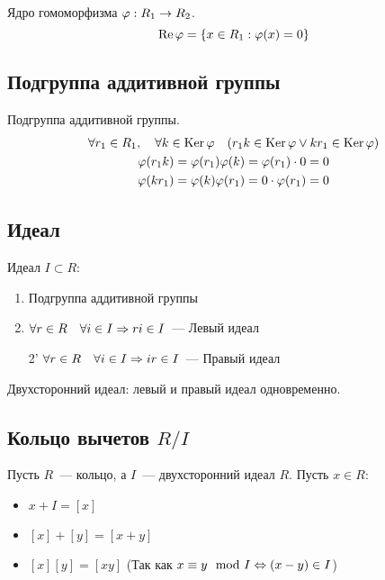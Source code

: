 \begin{definition}
  Ядро гомоморфизма $\varphi: R_1 \rightarrow R_2$.
  \[\operatorname{Re} \varphi = \{ x \in R_1: \varphi(x) = 0 \}\]
\end{definition}

\subsection{Подгруппа аддитивной группы}
\begin{proposition}
  Подгруппа аддитивной группы.
  \begin{gather}
    \forall r_1 \in R_1, \quad \forall k \in \operatorname{Ker} \varphi \quad (r_1 k \in \operatorname{Ker} \varphi \lor k r_1 \in \operatorname{Ker} \varphi) \\
    \varphi(r_1 k) = \varphi(r_1) \varphi(k) = \varphi (r_1) \cdot 0 = 0 \\
    \varphi(k r_1) = \varphi(k) \varphi(r_1) = 0 \cdot \varphi (r_1) = 0
  \end{gather}    
\end{proposition}

\subsection{Идеал}

\begin{definition}
  Идеал $I \subset R$:
  \begin{enumerate}
    \item Подгруппа аддитивной группы
    \item $\forall r \in R \quad \forall i \in I \Rightarrow ri \in I$~--- Левый идеал
    \item[2'] $\forall r \in R \quad \forall i \in I \Rightarrow ir \in I$~--- Правый идеал
  \end{enumerate}
  Двухсторонний идеал: левый и правый идеал одновременно.
\end{definition}

\subsection{Кольцо вычетов $R/I$}

\begin{definition}
  Пусть $R$~--- кольцо, а $I$~--- двухсторонний идеал $R$. Пусть $x \in R$:
  \begin{itemize}
    \item $x + I = [x]$
    \item $[x] + [y] = [x + y]$
    \item $[x][y] = [xy]$ (Так как $x \equiv y \mod I \Leftrightarrow (x - y) \in I$)
  \end{itemize}
\end{definition}

